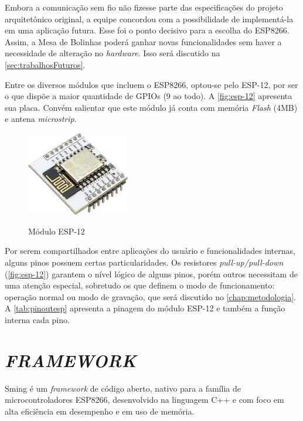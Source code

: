 Embora a comunicação sem fio não fizesse parte das especificações do projeto arquitetônico original, a equipe concordou com a possibilidade de implementá-la em uma aplicação futura. Esse foi o ponto decisivo para a escolha do ESP8266. Assim, a Mesa de Bolinhas poderá ganhar novas funcionalidades sem haver a necessidade de alteração no \emph{hardware}. Isso será discutido na \autoref{sec:trabalhosFuturos}.

Entre os diversos módulos que incluem o ESP8266, optou-se pelo ESP-12, por ser o que dispõe a maior quantidade de GPIOs (9 ao todo). A \autoref{fig:esp-12} apresenta sua placa. Convém salientar que este módulo já conta com memória \emph{Flash} (4MB) e antena \emph{microstrip}.

\begin{figure}[H]
    \centering
    \caption{Módulo ESP-12}
    \includegraphics[width=0.4\textwidth]{./dados/figuras/esp-12}
    \label{fig:esp-12}
\end{figure}

Por serem compartilhados entre aplicações do usuário e funcionalidades internas, alguns pinos possuem certas particularidades. Os resistores  \emph{pull-up/pull-down} (\autoref{fig:esp-12}) garantem o nível lógico de alguns pinos, porém outros necessitam de uma atenção especial, sobretudo os que definem o modo de funcionamento: operação normal ou modo de gravação, que será discutido no \autoref{chap:metodologia}. A \autoref{tab:pinoutesp} apresenta a pinagem do módulo ESP-12 e também a função interna cada pino.



\section{\emph{FRAMEWORK}}
\label{sec:framework}

Sming é um \emph{framework} de código aberto, nativo para a família de microcontroladores ESP8266, desenvolvido na linguagem {C++} e com foco em alta eficiência em desempenho e em uso de memória.

